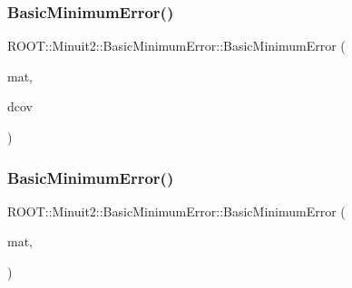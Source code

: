 \mbox{\label{classROOT_1_1Minuit2_1_1BasicMinimumError_a1896b4c1b5594ca688e33de9bcbadbbc}} 
\subsubsection{\texorpdfstring{BasicMinimumError()}{BasicMinimumError()}\hspace{0.1cm}{\footnotesize\ttfamily [16/21]}}
{\footnotesize\ttfamily R\+O\+O\+T\+::\+Minuit2\+::\+Basic\+Minimum\+Error\+::\+Basic\+Minimum\+Error (\begin{DoxyParamCaption}\item[{const \mbox{\hyperlink{namespaceROOT_1_1Minuit2_a9e74ad97f5537a2e80e52b04d98ecc6e}{Mn\+Algebraic\+Sym\+Matrix}} \&}]{mat,  }\item[{double}]{dcov }\end{DoxyParamCaption})\hspace{0.3cm}{\ttfamily [inline]}}

\mbox{\label{classROOT_1_1Minuit2_1_1BasicMinimumError_a86d224646bf8e8db5c8054f1ffbb9276}} 
\subsubsection{\texorpdfstring{BasicMinimumError()}{BasicMinimumError()}\hspace{0.1cm}{\footnotesize\ttfamily [17/21]}}
{\footnotesize\ttfamily R\+O\+O\+T\+::\+Minuit2\+::\+Basic\+Minimum\+Error\+::\+Basic\+Minimum\+Error (\begin{DoxyParamCaption}\item[{const \mbox{\hyperlink{namespaceROOT_1_1Minuit2_a9e74ad97f5537a2e80e52b04d98ecc6e}{Mn\+Algebraic\+Sym\+Matrix}} \&}]{mat,  }\item[{\mbox{\hyperlink{classROOT_1_1Minuit2_1_1BasicMinimumError_1_1MnHesseFailed}{Mn\+Hesse\+Failed}}}]{ }\end{DoxyParamCaption})\hspace{0.3cm}{\ttfamily [inline]}}

